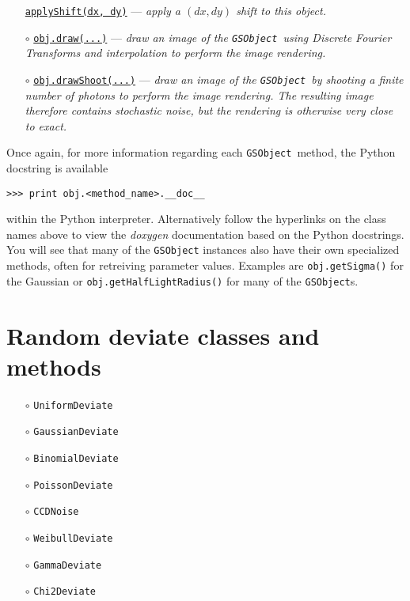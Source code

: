 \documentclass[preprint,11pt]{aastex}
\newcommand{\gsobject}{{\tt GSObject}}
\begin{document}
\begin{itemize}
  \href{http://galsim-developers.github.com/GalSim/classgalsim_1_1base_1_1_g_s_object.html#a6b547741eeec4086de9abe227dae9325}{\texttt{applyShift(dx,
      dy)}} --- \emph{apply a $(dx, dy)$ shift to this object.}
\item[$\circ$]
  \href{http://galsim-developers.github.com/GalSim/classgalsim_1_1base_1_1_g_s_object.html#ae0b346a8b438dedbc7f60a52220869d8}{\texttt{obj.draw(...)}}
  --- \emph{draw an image of the \gsobject~using Discrete Fourier
  Transforms and interpolation to perform the image rendering.}
\item[$\circ$]
  \href{http://galsim-developers.github.com/GalSim/classgalsim_1_1base_1_1_g_s_object.html#a42ac334d2840ba3fa832988e998beca0}{\texttt{obj.drawShoot(...)}}
  --- \emph{draw an image of the \gsobject~by shooting a finite number of
  photons to perform the image rendering.  The resulting image
  therefore contains stochastic noise, but the rendering is otherwise
  very close to exact.}
\end{itemize}
Once again, for more information regarding each \gsobject~method,
the Python docstring is available

{\tt >>> print obj.<method\_name>.\_\_doc\_\_}

within the Python interpreter.  Alternatively follow the hyperlinks on
the class names above to view the \emph{doxygen} documentation based
on the Python docstrings.  You will see that many of the \gsobject
instances also have their own specialized methods, often for
retreiving parameter values. Examples are \texttt{obj.getSigma()} for
the Gaussian or \texttt{obj.getHalfLightRadius()} for many of the
\gsobject s.

\section{Random deviate classes and methods}\label{sect:random}

\begin{itemize}

\item[$\circ$] \texttt{UniformDeviate}

\item[$\circ$] \texttt{GaussianDeviate}

\item[$\circ$] \texttt{BinomialDeviate}

\item[$\circ$] \texttt{PoissonDeviate}

\item[$\circ$] \texttt{CCDNoise}

\item[$\circ$] \texttt{WeibullDeviate}

\item[$\circ$] \texttt{GammaDeviate}

\item[$\circ$] \texttt{Chi2Deviate}

\end{itemize}
\end{document}
